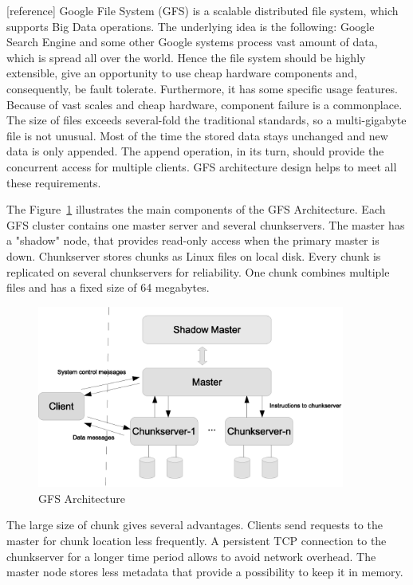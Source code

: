 [reference]
Google File System (GFS) is a scalable distributed file system, which supports Big Data operations.
The underlying idea is the following: Google Search Engine and some other Google systems process vast amount of data, which is spread all over the world.
Hence the file system should be highly extensible, give an opportunity to use cheap hardware components and, consequently, be fault tolerate. 
Furthermore, it has some specific usage features.
Because of vast scales and cheap hardware, component failure is a commonplace.
The size of files exceeds several-fold the traditional standards, so a multi-gigabyte file is not unusual.
Most of the time the stored data stays unchanged and new data is only appended.
The append operation, in its turn, should provide the concurrent access for multiple clients.
GFS architecture design helps to meet all these requirements.

The Figure~\ref{fig:GFS_architecture} illustrates the main components of the GFS
Architecture.
Each GFS cluster contains one master server and several chunkservers.
The master has a "shadow" node, that provides read-only access when the primary master is down. 
Chunkserver stores chunks as Linux files on local disk.
Every chunk is replicated on several chunkservers for reliability.
One chunk combines multiple files and has a fixed size of 64 megabytes.

\begin{figure}
  \centering
  \includegraphics [width=0.9\textwidth]{images/GFS_architecture}
  \caption{GFS Architecture}
  \label{fig:GFS_architecture}
\end{figure}

The large size of chunk gives several advantages.
Clients send requests to the master for chunk location less frequently.
A persistent TCP connection to the chunkserver for a longer time period allows to avoid network overhead.
The master node stores less metadata that provide a possibility to keep it in memory.


